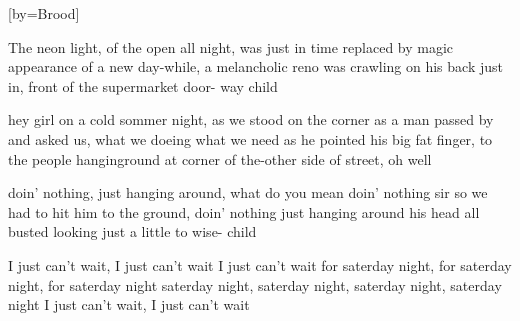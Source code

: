

[by=Brood]


\beginverse
The neon light, of the open all night,
was just in time replaced by magic appearance of a new day-while,
a melancholic reno was crawling on his back just in, front of the supermarket door- way child
\endverse

\beginverse
hey girl on a cold sommer night, as we stood on the corner
as a man passed by and asked us, what we doeing what we need
as he pointed his big fat finger, to the people hanginground
at corner of the-other side of street, oh well
\endverse

\beginverse
doin' nothing, just hanging around, what do you mean doin' nothing sir
so we had to hit him to the ground, doin' nothing just hanging around
his head all busted looking just a little to wise- child
\endverse

\beginverse
I just can't wait, I just can't wait
I just can't wait for saterday night, for saterday night, for saterday night
saterday night, saterday night, saterday night, saterday night
I just can't wait, I just can't wait
\endverse



\chordson
\endsong
